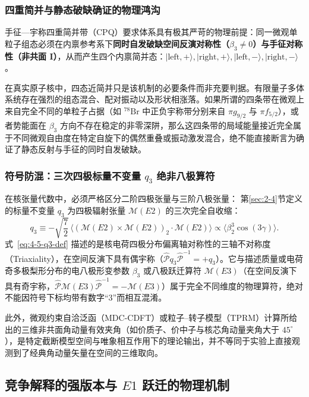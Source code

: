 \subsubsection{四重简并与静态破缺确证的物理鸿沟}

手征---宇称四重简并带（CPQ）要求体系具有极其严苛的物理前提：同一微观单粒子组态必须在内禀参考系下\textbf{同时自发破缺空间反演对称性（$\beta_3 \ne 0$）与手征对称性（非共面 $\mathbf{I}$）}，从而产生四个内禀简并态：$|\text{left}, +\rangle, |\text{right}, +\rangle, |\text{left}, -\rangle, |\text{right}, -\rangle$。

在真实原子核中，四态近简并只是该机制的必要条件而非充要判据。有限量子多体系统存在强烈的组态混合、配对振动以及形状相涨落。如果所谓的四条带在微观上来自完全不同的单粒子占据（如 $^{78}\mathrm{Br}$ 中正负宇称带分别来自 $\pi g_{9/2}$ 与 $\pi f_{5/2}$），或者势能面在 $\beta_3$ 方向不存在稳定的非零深阱，那么这四条带的局域能量接近完全属于不同微观自由度在特定自旋下的偶然重叠或振动激发混合，绝不能直接断言为确证了静态反射与手征的同时自发破缺。

\subsubsection{符号防混：三次四极标量不变量 $q_3$ 绝非八极算符}

在核张量代数中，必须严格区分二阶四极张量与三阶八极张量：
第\ref{sec:2-4}节定义的标量不变量 $q_3$ 为四极辐射张量 $\mathcal{M}(E2)$ 的三次完全自收缩：
\begin{equation}\label{eq:4-5-q3-def}
q_3 \equiv -\sqrt{\frac{7}{2}}\,\langle (\mathcal{M}(E2) \times \mathcal{M}(E2))_2 \cdot \mathcal{M}(E2) \rangle \propto \langle \beta_2^3 \cos(3\gamma) \rangle .
\end{equation}
式~\eqref{eq:4-5-q3-def} 描述的是核电荷四极分布偏离轴对称性的三轴不对称度（Triaxiality），在空间反演下具有偶宇称（$\hat{\mathcal{P}} q_3 \hat{\mathcal{P}}^{-1} = +q_3$）。它与描述质量或电荷奇多极梨形分布的电八极形变参数 $\beta_3$ 或八极跃迁算符 $\mathcal{M}(E3)$（在空间反演下具有奇宇称，$\hat{\mathcal{P}} \mathcal{M}(E3) \hat{\mathcal{P}}^{-1} = -\mathcal{M}(E3)$）属于完全不同维度的物理算符，绝对不能因符号下标均带有数字“3”而相互混淆。

此外，微观约束自洽泛函（MDC-CDFT）或粒子--转子模型（TPRM）计算所给出的三维非共面角动量有效夹角（如价质子、价中子与核芯角动量夹角大于 $45^\circ$），是特定截断模型空间与唯象相互作用下的理论输出，并不等同于实验上直接观测到了经典角动量矢量在空间的三维取向。

\subsection{竞争解释的强版本与 $E1$ 跃迁的物理机制}\label{sec:4-5-4}

